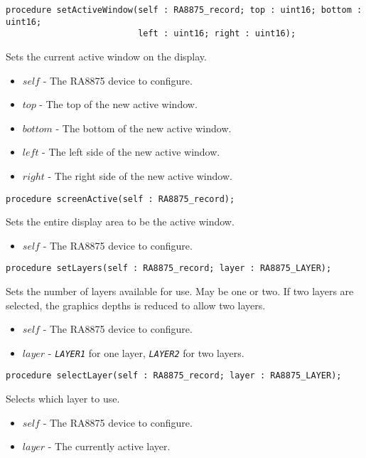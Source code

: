 \documentclass[10pt, openany]{book}
\newcommand{\constant}[1]{\emph{\texttt{#1}}}
\begin{document}
\begin{lstlisting}
procedure setActiveWindow(self : RA8875_record; top : uint16; bottom : uint16;
                          left : uint16; right : uint16);
\end{lstlisting}
Sets the current active window on the display.
\begin{itemize}
  \item $self$ - The RA8875 device to configure.
  \item $top$ - The top of the new active window.
  \item $bottom$ - The bottom of the new active window.
  \item $left$ - The left side of the new active window.
  \item $right$ - The right side of the new active window.
\end{itemize}

\begin{lstlisting}
procedure screenActive(self : RA8875_record);
\end{lstlisting}
Sets the entire display area to be the active window.
\begin{itemize}
  \item $self$ - The RA8875 device to configure.
\end{itemize}

\begin{lstlisting}
procedure setLayers(self : RA8875_record; layer : RA8875_LAYER);
\end{lstlisting}
Sets the number of layers available for use.  May be one or two.  If two layers are selected, the graphics depths is reduced to allow two layers.
\begin{itemize}
  \item $self$ - The RA8875 device to configure.
  \item $layer$ - \constant{LAYER1} for one layer, \constant{LAYER2} for two layers.
\end{itemize}

\begin{lstlisting}
procedure selectLayer(self : RA8875_record; layer : RA8875_LAYER);
\end{lstlisting}
Selects which layer to use.
\begin{itemize}
  \item $self$ - The RA8875 device to configure.
  \item $layer$ - The currently active layer.
\end{itemize}
\end{document}
